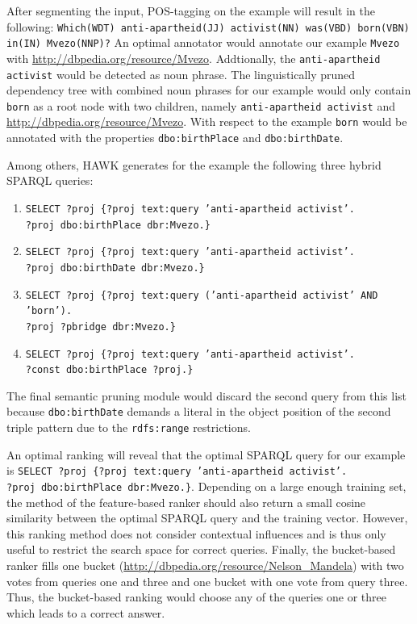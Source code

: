 After segmenting the input, POS-tagging on the  example will result in the following: \texttt{Which(WDT) anti-apartheid(JJ) activist(NN) was(VBD) born(VBN) in(IN) Mvezo(NNP)?}
An optimal annotator would annotate our  example \texttt{Mvezo} with \url{http://dbpedia.org/resource/Mvezo}.
Addtionally, the \texttt{anti-apartheid activist} would be detected as noun phrase.
The linguistically pruned dependency tree with combined noun phrases for our  example would only contain \texttt{born} as a root node with two children, namely \texttt{anti-apartheid activist} and \url{http://dbpedia.org/resource/Mvezo}.
With respect to the  example \texttt{born} would be annotated with the properties \texttt{dbo:birthPlace} and \texttt{dbo:birthDate}.

Among others, HAWK generates for the  example the following three hybrid SPARQL queries:
\begin{enumerate}
\item \texttt{SELECT ?proj  \{?proj text:query 'anti-apartheid activist'.\\ ?proj dbo:birthPlace dbr:Mvezo.\}}
\item \texttt{SELECT ?proj  \{?proj text:query 'anti-apartheid activist'.\\ ?proj dbo:birthDate dbr:Mvezo.\}}
\item \texttt{SELECT ?proj  \{?proj text:query ('anti-apartheid activist' AND 'born').\\ ?proj ?pbridge dbr:Mvezo.\}}
\item \texttt{SELECT ?proj  \{?proj text:query 'anti-apartheid activist'.\\ ?const dbo:birthPlace ?proj.\}}
\end{enumerate}

The final semantic pruning module would discard the second query from this list because \texttt{dbo:birthDate} demands a literal in the object position of the second triple pattern due to the \texttt{rdfs:range} restrictions.

An optimal ranking will reveal that the optimal SPARQL query for our example is \texttt{SELECT ?proj  \{?proj text:query 'anti-apartheid activist'.\\ ?proj dbo:birthPlace dbr:Mvezo.\}}.
Depending on a large enough training set, the method of the feature-based ranker should also return a small cosine similarity between the optimal SPARQL query and the training vector. 
However, this ranking method does not consider contextual influences and is thus only useful to restrict the search space for correct queries.
Finally, the bucket-based ranker fills one bucket (\url{http://dbpedia.org/resource/Nelson_Mandela}) with two votes from queries one and three and one bucket with one vote from query three. 
Thus, the bucket-based ranking would choose any of the queries one or three which leads to a correct answer.



